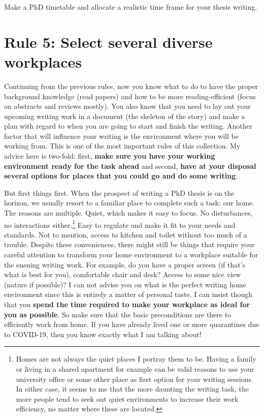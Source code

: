 \documentclass[
  12pt,
]{book}
\begin{document}
Make a PhD timetable and allocate a realistic time frame for your thesis writing.

\hypertarget{rule5}{%
\section*{\texorpdfstring{\textbf{Rule 5:} Select several diverse workplaces}{Rule 5: Select several diverse workplaces}}\label{rule5}}

Continuing from the previous rules, now you know what to do to have the proper background knowledge (read papers) and how to be more reading-efficient (focus on abstracts and reviews mostly).
You also know that you need to lay out your upcoming writing work in a document (the skeleton of the story) and make a plan with regard to when you are going to start and finish the writing.
Another factor that will influence your writing is the environment where you will be working from.
This is one of the most important rules of this collection.
My advice here is two-fold: first, \textbf{make sure you have your working environment ready for the task ahead} and second, \textbf{have at your disposal several options for places that you could go and do some writing}.

But first things first.
When the prospect of writing a PhD thesis is on the horizon, we usually resort to a familiar place to complete such a task: our home.
The reasons are multiple.
Quiet, which makes it easy to focus.
No disturbances, no interactions either.\footnote{Homes are not always the quiet places I portray them to be. Having a family or living in a shared apartment for example can be valid reasons to use your university office or some other place as first option for your writing sessions. In either case, it seems to me that the more daunting the writing task, the more people tend to seek out quiet environments to increase their work efficiency, no matter where these are located.}
Easy to regulate and make it fit to your needs and standards.
Not to mention, access to kitchen and toilet without too much of a trouble.
Despite these conveniences, there might still be things that require your careful attention to transform your home environment to a workplace suitable for the ensuing writing work.
For example, do you have a proper screen (if that's what is best for you), comfortable chair and desk?
Access to some nice view (nature if possible)?
I can not advise you on what is the perfect writing home environment since this is entirely a matter of personal taste.
I can insist though that you \textbf{spend the time required to make your workplace as ideal for you as possible}.
So make sure that the basic preconditions are there to efficiently work from home.
If you have already lived one or more quarantines due to COVID-19, then you know exactly what I am talking about!
\end{document}
